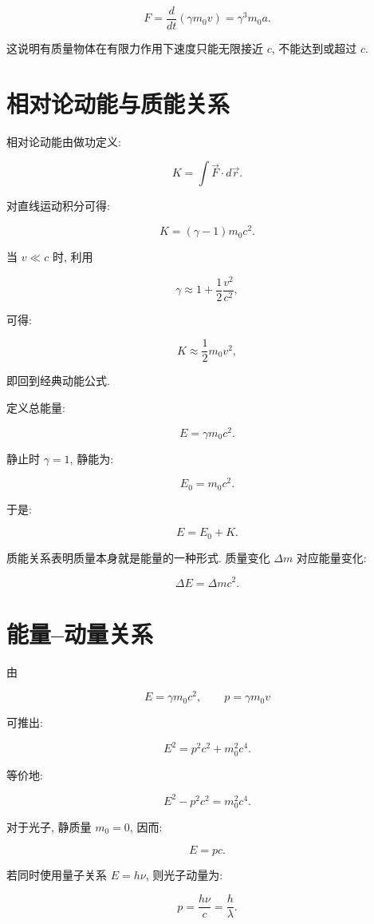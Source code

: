 \documentclass[
  a4paper,
]{ctexrep}
\begin{document}
\[
F = \frac{d}{dt}(\gamma m_0 v)=\gamma^3 m_0 a.
\]

这说明有质量物体在有限力作用下速度只能无限接近 \(c\), 不能达到或超过
\(c\).

\section{相对论动能与质能关系}\label{ux76f8ux5bf9ux8bbaux52a8ux80fdux4e0eux8d28ux80fdux5173ux7cfb}

相对论动能由做功定义:

\[
K = \int \vec{F}\cdot d\vec{r}.
\]

对直线运动积分可得:

\[
K = (\gamma-1)m_0c^2.
\]

当 \(v\ll c\) 时, 利用

\[
\gamma \approx 1 + \frac{1}{2}\frac{v^2}{c^2},
\]

可得:

\[
K \approx \frac{1}{2}m_0v^2,
\]

即回到经典动能公式.

定义总能量:

\[
E = \gamma m_0c^2.
\]

静止时 \(\gamma=1\), 静能为:

\[
E_0 = m_0c^2.
\]

于是:

\[
E = E_0 + K.
\]

质能关系表明质量本身就是能量的一种形式. 质量变化 \(\Delta m\)
对应能量变化:

\[
\Delta E = \Delta m c^2.
\]

\section{能量--动量关系}\label{ux80fdux91cfux52a8ux91cfux5173ux7cfb}

由

\[
E = \gamma m_0c^2, \qquad p=\gamma m_0v
\]

可推出:

\[
E^2 = p^2c^2 + m_0^2c^4.
\]

等价地:

\[
E^2 - p^2c^2 = m_0^2c^4.
\]

对于光子, 静质量 \(m_0=0\), 因而:

\[
E = pc.
\]

若同时使用量子关系 \(E=h\nu\), 则光子动量为:

\[
p=\frac{h\nu}{c}=\frac{h}{\lambda}.
\]
\end{document}
